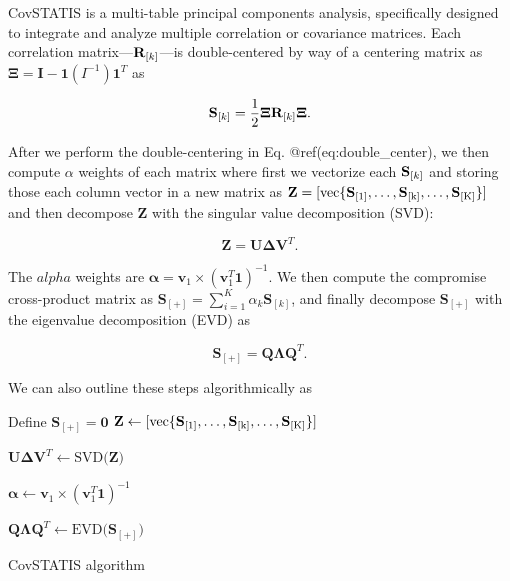 \documentclass[man,floatsintext]{apa6}
\theoremstyle{definition}
\theoremstyle{definition}
\theoremstyle{definition}
\theoremstyle{remark}
\begin{document}
CovSTATIS is a multi-table principal components analysis, specifically
designed to integrate and analyze multiple correlation or covariance
matrices. Each correlation matrix---\({\bf R}_{[k]}\)---is
double-centered by way of a centering matrix as
\({\boldsymbol \Xi} = \mathbf{I} - \mathbf{1}(I^{-1})\mathbf{1}^{T}\) as

\begin{equation}
{\bf S}_{[k]} = \frac{1}{2}{\boldsymbol \Xi}{\bf R}_{[k]}{\boldsymbol \Xi}.
\label{eq:double_center}
\end{equation}

After we perform the double-centering in Eq. @ref(eq:double\_center), we
then compute \(\alpha\) weights of each matrix where first we vectorize
each \({\bf S}_{[k]}\) and storing those each column vector in a new
matrix as
\(\mathbf{Z} = [ \mathrm{vec\{ {\bf S}_{[1]}, \dots, {\bf S}_{[k]}, \dots, {\bf S}_{[K]} \}} ]\)
and then decompose \(\mathbf{Z}\) with the singular value decomposition
(SVD):

\begin{equation}
\mathbf{Z} = \mathbf{U}\boldsymbol{\Delta}\mathbf{V}^{T}.
\end{equation}

The \(alpha\) weights are
\(\boldsymbol{\alpha} = \mathbf{v}_{1} \times (\mathbf{v}_{1}^{T}\mathbf{1})^{-1}\).
We then compute the compromise cross-product matrix as
\(\mathbf{S}_{[+]} = \sum\limits_{i=1}^K \alpha_{k}\mathbf{S}_{[k]}\),
and finally decompose \(\mathbf{S}_{[+]}\) with the eigenvalue
decomposition (EVD) as

\begin{equation}
\mathbf{S}_{[+]} = \mathbf{Q}\boldsymbol{\Lambda}\mathbf{Q}^{T}.
\end{equation}

We can also outline these steps algorithmically as

\begin{algorithm}
\DontPrintSemicolon
\SetAlgoLined
{}
\Input{$[{\bf R}_{[1]} ... {\bf R}_{[k]} ... {\bf R}_{[K]}]$}
Define $\mathbf{S}_{[+]} = \mathbf{0}$
\BlankLine
{}
$\mathbf{Z} \leftarrow [ \mathrm{vec\{ {\bf S}_{[1]}, \dots, {\bf S}_{[k]}, \dots, {\bf S}_{[K]}   \}} ]$

$\mathbf{U}\boldsymbol{\Delta}\mathbf{V}^{T} \leftarrow \mathrm{SVD(}\mathbf{Z}\mathrm{)}$

$\boldsymbol{\alpha} \leftarrow \mathbf{v}_{1}  \times (\mathbf{v}_{1}^{T}\mathbf{1})^{-1}$


$\mathbf{Q}\boldsymbol{\Lambda}\mathbf{Q}^{T} \leftarrow \mathrm{EVD(}\mathbf{S}_{[+]}\mathrm{)}$
\caption{CovSTATIS algorithm}
\label{algo:covstatis}
\end{algorithm}
\end{document}
